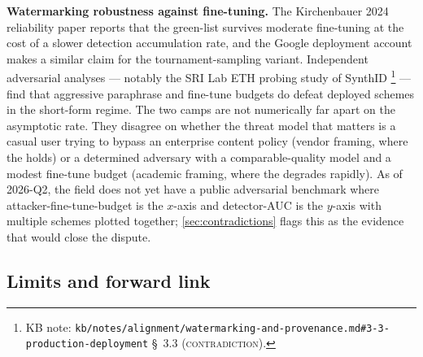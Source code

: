 \begin{contradiction}
\textbf{Watermarking robustness against fine-tuning.} The Kirchenbauer
2024 reliability paper  reports that the
green-list  survives moderate fine-tuning at the cost of a
slower detection accumulation rate, and the Google 
deployment account
makes a similar claim for the tournament-sampling variant. Independent
adversarial analyses --- notably the SRI Lab ETH probing study of
SynthID%
\footnote{KB note: \texttt{kb/notes/alignment/watermarking-and-provenance.md\#3-3-production-deployment}
\S~3.3 (\textsc{contradiction}).}
--- find that aggressive paraphrase and fine-tune budgets do defeat
deployed schemes in the short-form regime. The two camps are not
numerically far apart on the asymptotic rate. They disagree on whether
the threat model that matters is a casual user trying to bypass an
enterprise content policy (vendor framing, where the  holds)
or a determined adversary with a comparable-quality model and a
modest fine-tune budget (academic framing, where the 
degrades rapidly). As of 2026-Q2, the field does not yet have a
public adversarial benchmark where attacker-fine-tune-budget is the
$x$-axis and detector-AUC is the $y$-axis with multiple 
schemes plotted together; \cref{sec:contradictions} flags this as
the evidence that would close the dispute.
\end{contradiction}

\subsection{Limits and forward link}
\label{sec:watermarking-forward}

